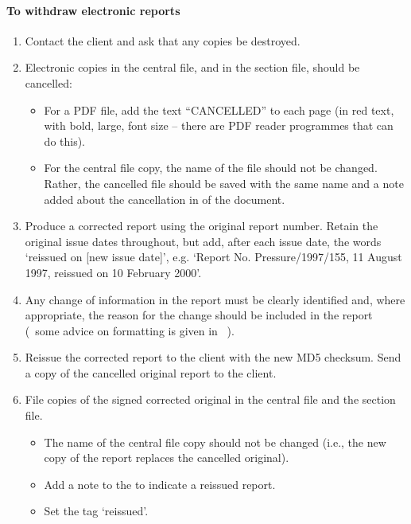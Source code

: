 \paragraph{To withdraw electronic reports}
\begin{enumerate}
\item Contact the client and ask that any copies be destroyed. 

\item Electronic copies in the central file, and in the section file, should be cancelled:
\begin{itemize}
\item For a PDF file, add the text “{\color{red}CANCELLED}” to each page (in red text, with bold, large, font size – there are PDF reader programmes that can do this). 
\item For the central file copy, the name of the file should not be changed. Rather, the cancelled file should be saved with the same name and a note added about the cancellation in  of the document. 
\end{itemize}

\item Produce a corrected report using the original report number.  Retain the original issue dates throughout, but add, after each issue date, the words `reissued on [new issue date]', e.g. `Report No. Pressure/1997/155, 11 August 1997, reissued on 10 February 2000'.

\item Any change of information in the report must be clearly identified and, where appropriate, the reason for the change should be included in the report (~some advice on formatting is given in \cite[\S\ref*{GRP-ss:reissued_reports}]{MSL_Reporting_Guidelines}~).

\item Reissue the corrected report to the client with the new MD5 checksum. Send a copy of the cancelled original report to the client. 

\item File copies of the signed corrected original in the central file and the section file. 
\begin{itemize}
\item The name of the central file copy should not be changed (i.e., the new copy of the report replaces the cancelled original). 
\item Add a note to the  to indicate a reissued report.
\item Set the  tag `reissued'.
\end{itemize}
\end{enumerate}

